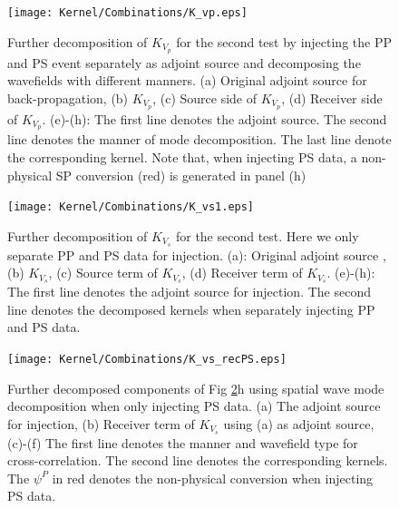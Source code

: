 \documentclass[extra,mreferee]{gji}
\begin{document}
\begin{figure}
   \centering
   {\texttt{[image: Kernel/Combinations/K\_vp.eps]}}
   \caption{
   Further decomposition of $K_{V_p}$ for the second test by injecting the PP
   and PS event separately as adjoint source and decomposing the wavefields with different manners. 
   (a) Original adjoint source
   for back-propagation, (b) $K_{V_p}$, (c) Source side of $K_{V_p}$, (d)
   Receiver side of $K_{V_p}$. (e)-(h): The first line denotes the adjoint source. 
   The second line denotes the manner of mode decomposition. The last line
   denote the corresponding kernel. Note that, when injecting PS data, a
   non-physical SP conversion (red) is generated
   in panel (h)}
   \label{fig:kernel_vp_decomp}
\end{figure}
\begin{figure}
   \centering
   {\texttt{[image: Kernel/Combinations/K\_vs1.eps]}}
   \caption{
   Further decomposition of $K_{V_s}$ for the second test. Here we only separate PP and PS data
   for injection. (a): Original adjoint source
   , (b) $K_{V_s}$, (c) Source term of $K_{V_s}$, (d)
   Receiver term of $K_{V_s}$. (e)-(h): The first line denotes the adjoint source for
   injection. The second line denotes the decomposed kernels when separately
   injecting PP and PS data. 
   }
   \label{fig:kernel_vs_decomp}
\end{figure}
\clearpage
\begin{figure}
   \centering
   {\texttt{[image: Kernel/Combinations/K\_vs\_recPS.eps]}}
   \caption{Further decomposed components of Fig \ref{fig:kernel_vs_decomp}h using spatial wave mode
   decomposition when only injecting PS data. (a) The adjoint source
   for injection, (b) Receiver term of $K_{V_s}$ using (a) as adjoint source, (c)-(f) 
   The first line denotes the manner and wavefield type for cross-correlation.
   The second line denotes the corresponding kernels.
   The $\psi^P$ in red denotes the non-physical conversion when injecting PS data.
   }
   \label{fig:kernel_vs_recPS}
\end{figure}

\clearpage
\end{document}
